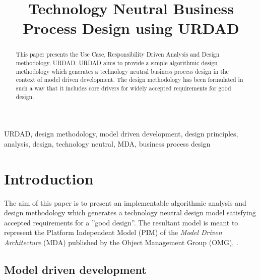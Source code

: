 \documentclass{IOS-Book-Article}
\begin{document}
\begin{frontmatter}             

\title{Technology Neutral Business Process Design using URDAD}

\author{ }
\address{Solms Training and Consulting CC, PostNet Suite 237, Private Bag X9, Melville, 2109, Johannesburg, South Africa; E-mail: fritz@solms.co.za.}

\begin{abstract}
  This paper presents the Use Case, Responsibility Driven Analysis and Design methodology, URDAD.
  URDAD aims to provide a simple algorithmic design methodology which generates a technology neutral
  business process design in the context of model driven development. The design methodology has
  been formulated in such a way that it includes core drivers for widely accepted requirements for good design.
\end{abstract}

\begin{keyword}
URDAD, design methodology, model driven development, design principles, analysis, design,
technology neutral, MDA, business process design
\end{keyword}
\end{frontmatter}

\thispagestyle{empty}
\pagestyle{empty}



\section{Introduction}

The aim of this paper is to present an implementable algorithmic analysis and design 
methodology which generates a technology neutral design model satisfying accepted
requirements for a ''good design''. The resultant model
is meant to represent the Platform Independent Model (PIM) of the
\textit{Model Driven Architecture} (MDA) published
by the Object Management Group (OMG), \cite{siegel:developingInMDA,frankel:enterpriseMDA}.


\subsection{Model driven development}
\end{document}
